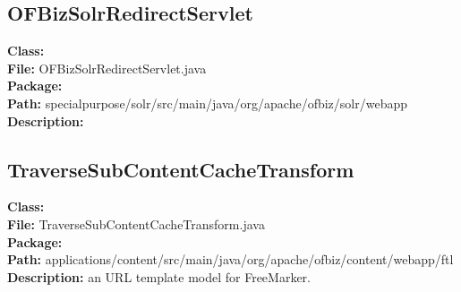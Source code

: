 \subsection{OFBizSolrRedirectServlet}
	\textbf{Class:}  \\ 
	\textbf{File:} OFBizSolrRedirectServlet.java \\ 
	\textbf{Package:}  \\ 
	\textbf{Path:} specialpurpose/solr/src/main/java/org/apache/ofbiz/solr/webapp \\
	\textbf{Description:}
	
	
\subsection{TraverseSubContentCacheTransform}
\textbf{Class:}  \\ 
\textbf{File:} TraverseSubContentCacheTransform.java \\ 
\textbf{Package:}  \\ 
\textbf{Path:} applications/content/src/main/java/org/apache/ofbiz/content/webapp/ftl
\textbf{Description:} an URL template model for FreeMarker.
